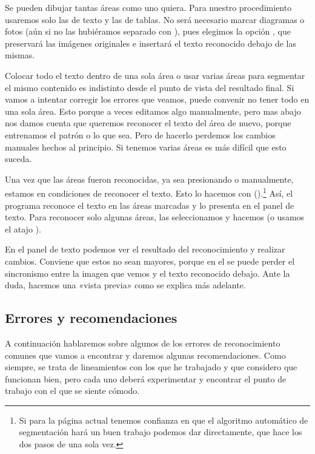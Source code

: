 \documentclass[%
	a5paper,
	10pt,
	twoside,
	openright,
	final,
]{memoir}
\begin{document}
{	Se pueden dibujar tantas áreas como uno quiera. Para nuestro procedimiento usaremos solo las de texto y las de tablas. No será necesario marcar diagramas o fotos (aún si no las hubiéramos separado con \scantailor), pues elegimos la opción , que preservará las imágenes originales e insertará el texto reconocido debajo de las mismas.

	Colocar todo el texto dentro de una sola área o usar varias áreas para segmentar el mismo contenido es indistinto desde el punto de vista del resultado final. Si vamos a intentar corregir los errores que veamos, puede convenir no tener todo en una sola área. Esto porque a veces editamos algo manualmente, pero mas abajo nos damos cuenta que queremos reconocer el texto del área de nuevo, porque entrenamos el patrón o lo que sea. Pero de hacerlo perdemos los cambios manuales hechos al principio. Si tenemos varias áreas es más difícil que esto suceda.

	Una vez que las áreas fueron reconocidas, ya sea presionando  o manualmente, estamos en condiciones de reconocer el texto. Esto lo hacemos con  ().\footnote{Si para la página actual tenemos confianza en que el algoritmo automático de segmentación hará un buen trabajo podemos dar  directamente, que hace los dos pasos de una sola vez.} Así, el programa reconoce el texto en las áreas marcadas y lo presenta en el panel de texto. Para reconocer solo algunas áreas, las seleccionamos y hacemos  (o usamos el atajo ).

	En el panel de texto podemos ver el resultado del reconocimiento y realizar cambios. Conviene que estos no sean mayores, porque en el \pdf se puede perder el sincronismo entre la imagen que vemos y el texto reconocido debajo. Ante la duda, hacemos una «vista previa» como se explica más adelante.

	\subsection{Errores y recomendaciones} A continuación hablaremos sobre algunos de los errores de reconocimiento comunes que vamos a encontrar y daremos algunas recomendaciones. Como siempre, se trata de lineamientos con los que he trabajado y que considero que funcionan bien, pero cada uno deberá experimentar y encontrar el punto de trabajo con el que se siente cómodo. %

}
\end{document}

